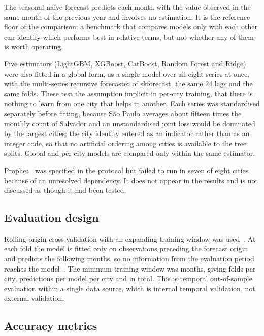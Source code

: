\documentclass[10pt,letterpaper]{article}
\begin{document}
The seasonal naive forecast predicts each month with the value observed in the same month of the previous year and involves no estimation. It is the reference floor of the comparison: a benchmark that compares models only with each other can identify which performs best in relative terms, but not whether any of them is worth operating.

Five estimators (LightGBM, XGBoost, CatBoost, Random Forest and Ridge) were also fitted in a global form, as a single model over all eight series at once, with the multi-series recursive forecaster of skforecast, the same 24 lags and the same folds. These test the assumption implicit in per-city training, that there is nothing to learn from one city that helps in another. Each series was standardised separately before fitting, because S\~ao Paulo averages about fifteen times the monthly count of Salvador and an unstandardised joint loss would be dominated by the largest cities; the city identity entered as an indicator rather than as an integer code, so that no artificial ordering among cities is available to the tree splits. Global and per-city models are compared only within the same estimator.

Prophet~\cite{Taylor2018prophet} was specified in the protocol but failed to run in seven of eight cities because of an unresolved dependency. It does not appear in the results and is not discussed as though it had been tested.

\subsection*{Evaluation design}

Rolling-origin cross-validation with an expanding training window was used~\cite{Tashman2000,Hewamalage2023}. At each fold the model is fitted only on observations preceding the forecast origin and predicts the following  months, so no information from the evaluation period reaches the model~\cite{Kapoor2023}. The minimum training window was  months, giving  folds per city,  predictions per model per city and  in total. This is temporal out-of-sample evaluation within a single data source, which is internal temporal validation, not external validation.

\subsection*{Accuracy metrics}
\end{document}
